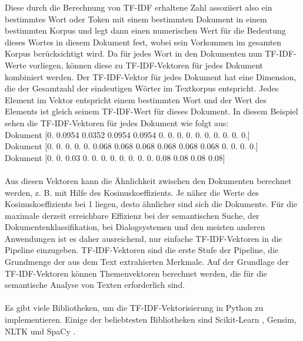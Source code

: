 Diese durch die Berechnung von \ac{TF-IDF} erhaltene Zahl assoziiert also ein bestimmtes Wort oder Token mit einem bestimmten Dokument in einem bestimmten Korpus und legt dann einen numerischen Wert für die Bedeutung dieses Wortes in diesem Dokument fest, wobei sein Vorkommen im gesamten Korpus berücksichtigt wird. 
Da für jedes Wort in den Dokumenten nun \ac{TF-IDF}-Werte vorliegen, können diese zu \ac{TF-IDF}-Vektoren für jedes Dokument kombiniert werden. 
Der \ac{TF-IDF}-Vektor für jedes Dokument hat eine Dimension, die der Gesamtzahl der eindeutigen Wörter im Textkorpus entspricht. 
Jedes Element im Vektor entspricht einem bestimmten Wort und der Wert des Elements ist gleich seinem \ac{TF-IDF}-Wert für dieses Dokument. 
In diesem Beispiel sehen die \ac{TF-IDF}-Vektoren für jedes Dokument wie folgt aus:\\
Dokument  [0. 0.0954 0.0352 0.0954 0.0954 0. 0. 0. 0. 0. 0. 0. 0. 0. 0.]\\
Dokument  [0. 0. 0. 0. 0. 0.068 0.068 0.068 0.068 0.068 0.068 0. 0. 0. 0.]\\
Dokument  [0. 0. 0.03 0. 0. 0. 0. 0. 0. 0. 0. 0.08 0.08 0.08 0.08]\\\\
Aus diesen Vektoren kann die Ähnlichkeit zwischen den Dokumenten berechnet werden, z. B. mit Hilfe des Kosinuskoeffizients. 
Je näher die Werte des Kosinuskoeffizients bei 1 liegen, desto ähnlicher sind sich die Dokumente. 
Für die maximale derzeit erreichbare Effizienz bei der semantischen Suche, der Dokumentenklassifikation, bei Dialogsystemen und den meisten anderen Anwendungen ist es daher ausreichend, nur einfache \ac{TF-IDF}-Vektoren in die Pipeline einzugeben. 
\ac{TF-IDF}-Vektoren sind die erste Stufe der Pipeline, die Grundmenge der aus dem Text extrahierten Merkmale. 
Auf der Grundlage der \ac{TF-IDF}-Vektoren können Themenvektoren berechnet werden, die für die semantische Analyse von Texten erforderlich sind. \cite{lane_natural_2019}\\\\
Es gibt viele Bibliotheken, um die \ac{TF-IDF}-Vektorisierung in Python zu implementieren. 
Einige der beliebtesten Bibliotheken sind Scikit-Learn \cite{scikit-learn}, Gensim, \ac{NLTK} \cite{nltk_tfidf} und SpaCy \cite{spacy_tfidf}.
